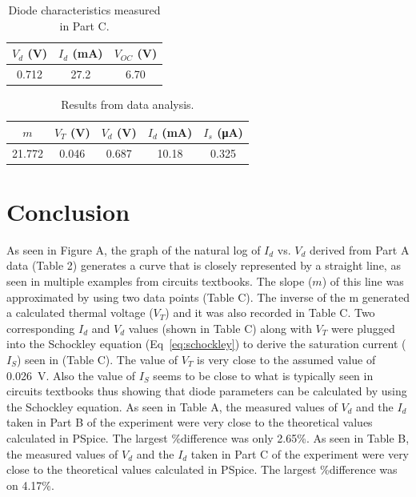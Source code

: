 \documentclass{article}
\begin{document}
\begin{table}[hbtp]
  \centering
  \begin{tabular}{ccc}
    $V_d$ (\si{V}) & $I_d$ (\si{mA}) & $V_{OC}$ (\si{V}) \\
    \hline
    0.712 & 27.2 & 6.70 \\
  \end{tabular}
  \caption{\label{tab:part_c} Diode characteristics measured in Part C.}
\end{table}

\begin{table}[hbtp]
  \centering
  \begin{tabular}{ccccc}
    $m$ & $V_T$ (\si{V}) & $V_d$ (\si{V}) & $I_d$ (\si{mA}) & $I_s$ (\si{\micro\ampere}) \\
    \hline
    21.772 & 0.046 & 0.687 & 10.18 & 0.325 \\
  \end{tabular}
  \caption{\label{tab:analysis} Results from data analysis.}
\end{table}

\section{Conclusion}
\label{sec:conclusion}


As seen in Figure A, the graph of the natural log of $I_d$ vs. $V_d$
derived from Part A data (Table 2) generates a curve that is closely
represented by a straight line, as seen in multiple examples from
circuits textbooks.  The slope ($m$) of this line was approximated by
using two data points (Table C).  The inverse of the m generated a
calculated thermal voltage ($V_T$) and it was also recorded in Table
C.  Two corresponding $I_d$ and $V_d$ values (shown in Table C) along
with $V_T$ were plugged into the Schockley equation
(Eq~\ref{eq:schockley}) to derive the saturation current ($I_S$) seen
in (Table C).  The value of $V_T$ is very close to the assumed value
of \SI{0.026}{V}.  Also the value of $I_S$ seems to be close to what
is typically seen in circuits textbooks thus showing that diode
parameters can be calculated by using the Schockley equation.  As seen
in Table A, the measured values of $V_d$ and the $I_d$ taken in Part B
of the experiment were very close to the theoretical values calculated
in PSpice. The largest \%difference was only 2.65\%.  As seen in Table
B, the measured values of $V_d$ and the $I_d$ taken in Part C of the
experiment were very close to the theoretical values calculated in
PSpice. The largest \%difference was on 4.17\%.
\end{document}
